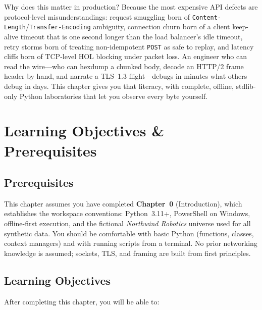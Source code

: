 Why does this matter in production? Because the most expensive API defects are protocol-level misunderstandings: request smuggling born of \texttt{Content-Length}/\texttt{Transfer-Encoding} ambiguity, connection churn born of a client keep-alive timeout that is one second longer than the load balancer's idle timeout, retry storms born of treating non-idempotent \texttt{POST} as safe to replay, and latency cliffs born of TCP-level HOL blocking under packet loss. An engineer who can read the wire---who can hexdump a chunked body, decode an HTTP/2 frame header by hand, and narrate a TLS~1.3 flight---debugs in minutes what others debug in days. This chapter gives you that literacy, with complete, offline, stdlib-only Python laboratories that let you observe every byte yourself.

\section{Learning Objectives \& Prerequisites}

\subsection*{Prerequisites}

This chapter assumes you have completed \textbf{Chapter~0} (Introduction), which establishes the workspace conventions: Python~3.11+, PowerShell on Windows, offline-first execution, and the fictional \emph{Northwind Robotics} universe used for all synthetic data. You should be comfortable with basic Python (functions, classes, context managers) and with running scripts from a terminal. No prior networking knowledge is assumed; sockets, TLS, and framing are built from first principles.

\subsection*{Learning Objectives}

After completing this chapter, you will be able to:

